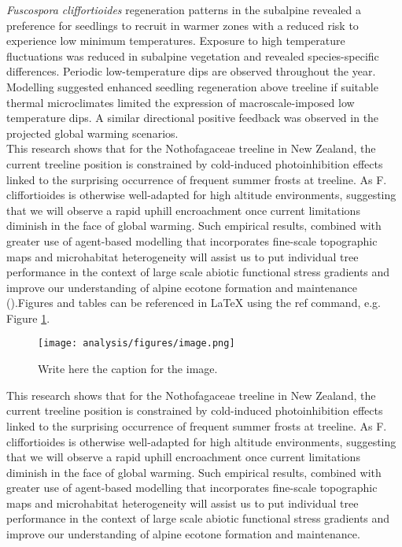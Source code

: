 \documentclass[12pt]{article}
\begin{document}
\noindent \textit{Fuscospora cliffortioides} regeneration patterns in the subalpine revealed a preference for seedlings to recruit in warmer zones with a reduced risk to experience low minimum temperatures. Exposure to high temperature fluctuations was reduced in subalpine vegetation and revealed species-specific differences. Periodic low-temperature dips are observed throughout the year. Modelling suggested enhanced seedling regeneration above treeline if suitable thermal microclimates limited the expression of macroscale-imposed low temperature dips. A similar directional positive feedback was observed in the projected global warming scenarios.\\
\indent This research shows that for the Nothofagaceae treeline in New Zealand, the current treeline position is constrained by cold-induced photoinhibition effects linked to the surprising occurrence of frequent summer frosts at treeline. As F. cliffortioides is otherwise well-adapted for high altitude environments, suggesting that we will observe a rapid uphill encroachment once current limitations diminish in the face of global warming. Such empirical results, combined with greater use of agent-based modelling that incorporates fine-scale topographic maps and microhabitat heterogeneity will assist us to put individual tree performance in the context of large scale abiotic functional stress gradients and improve our understanding of alpine ecotone formation and maintenance (\cite{barnas_comparison_2019}).Figures and tables can be referenced in LaTeX using the ref command, e.g. Figure \ref{fig:leiden}. 


\begin{figure}[ht]  %
\centering %
\texttt{[image: analysis/figures/image.png]}
\caption{Write here the caption for the image.}
\label{fig:leiden}
\end{figure}


\noindent This research shows that for the Nothofagaceae treeline in New Zealand, the current treeline position is constrained by cold-induced photoinhibition effects linked to the surprising occurrence of frequent summer frosts at treeline. As F. cliffortioides is otherwise well-adapted for high altitude environments, suggesting that we will observe a rapid uphill encroachment once current limitations diminish in the face of global warming. Such empirical results, combined with greater use of agent-based modelling that incorporates fine-scale topographic maps and microhabitat heterogeneity will assist us to put individual tree performance in the context of large scale abiotic functional stress gradients and improve our understanding of alpine ecotone formation and maintenance.
\end{document}

